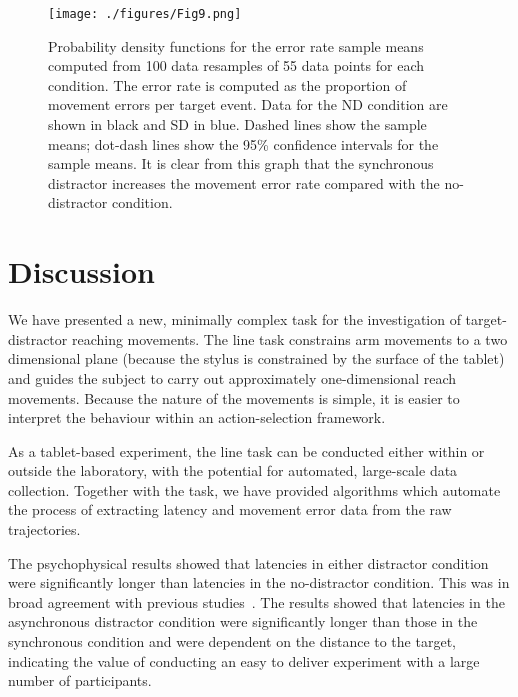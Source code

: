 \documentclass[10pt,letterpaper]{article}
\begin{document}
\begin{figure}[htb!]
\centering
\texttt{[image: ./figures/Fig9.png]} %
\caption[Bootstrapped error PDFS] {Probability density functions for
  the error rate sample means computed from 100 data resamples of 55
  data points for each condition. The error rate is computed as the
  proportion of movement errors per target event. Data for the ND
  condition are shown in black and SD in blue. Dashed lines show the
  sample means; dot-dash lines show the 95\% confidence intervals for
  the sample means. It is clear from this graph that
  the synchronous distractor increases the movement error rate
  compared with the no-distractor condition.}
\label{bootstrap_errors}
\end{figure}

\section*{Discussion}

We have presented a new, minimally complex task for the investigation
of target-distractor reaching movements.  The line task constrains arm
movements to a two dimensional plane (because the stylus is
constrained by the surface of the tablet) and guides the subject to
carry out approximately one-dimensional reach movements. Because the
nature of the movements is simple, it is easier to interpret the
behaviour within an action-selection framework.

As a tablet-based experiment, the line task can be conducted either
within or outside the laboratory, with the potential for automated,
large-scale data collection.
%
Together with the task, we have provided algorithms
which automate the process of extracting latency and movement error
data from the raw trajectories.



The psychophysical results showed that latencies in either distractor
condition were significantly longer than latencies in the
no-distractor condition. This was in broad agreement with previous
studies~\cite{tipper_selective_1992,meegan_visual_1999,pratt_action-centered_1994}.
The results showed that latencies in
the asynchronous distractor condition were significantly longer than
those in the synchronous condition and were dependent on the distance
to the target, indicating the value of conducting an easy to deliver
experiment with a large number of participants.
\end{document}
